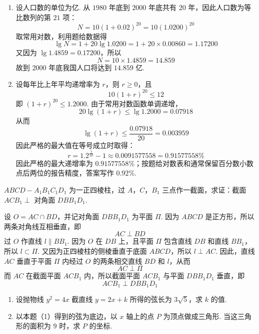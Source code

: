 \documentclass[UTF8,a4paper,oneside,11pt]{ctexbook}
\begin{document}
\begin{solution}
\begin{enumerate}
\item 设人口数的单位为亿. 从 \(1980\) 年底到 \(2000\) 年底共有 \(20\) 年，因此人口数为等比数列的第 \(21\) 项：
\[
N=10(1+0.02)^{20}=10(1.0200)^{20}
\]
取常用对数，利用题给数据得
\[
\lg N=1+20\lg1.0200=1+20\times0.00860=1.17200
\]
又因为 \(\lg1.4859=0.17200\)，所以
\[
N=10\times1.4859=14.859
\]
故到 \(2000\) 年底我国人口将达到 \(14.859\text{ 亿}\).
\item 设每年比上年平均递增率为 \(r\)，则 \(r\ge0\)，且
\[
10(1+r)^{20}\le12
\]
即 \((1+r)^{20}\le1.2000\). 由于常用对数函数单调递增，
\[
20\lg(1+r)\le\lg1.2000=0.07918
\]
从而
\[
\lg(1+r)\le\frac{0.07918}{20}=0.003959
\]
因此严格的最大值在等号成立时取得：
\[
r=1.2^{\frac{1}{20}}-1\approx0.0091577558=0.91577558\%
\]
因此严格的最大递增率为 \(0.91577558\%\)；按题给对数表和通常保留百分数小数点后两位的报告精度，答案写作 \(0.92\%\).
\end{enumerate}
\end{solution}

\begin{problem}
\(ABCD-A_{1}B_{1}C_{1}D_{1}\) 为一正四棱柱，过 \(A\)，\(C\)，\(B_{1}\) 三点作一截面，求证：截面 \(ACB_{1}\perp\) 对角面 \(DBB_{1}D_{1}\).
\end{problem}

\begin{solution}
设 \(O=AC\cap BD\)，并记对角面 \(DBB_{1}D_{1}\) 为平面 \(\Pi\). 因为 \(ABCD\) 是正方形，所以两条对角线互相垂直，即
\[
AC\perp BD
\]
过 \(O\) 作直线 \(l\parallel BB_{1}\). 因为 \(O\) 在 \(DB\) 上，且平面 \(\Pi\) 包含直线 \(DB\) 和直线 \(BB_{1}\)，所以 \(l\subset\Pi\). 又因为正四棱柱的侧棱垂直于底面 \(ABCD\)，所以 \(l\perp AC\). 因此，直线 \(AC\) 垂直于平面 \(\Pi\) 内经过 \(O\) 的两条相交直线 \(BD\) 和 \(l\)，从而
\[
AC\perp\Pi
\]
而 \(AC\) 在截面平面 \(ACB_{1}\) 内，所以截面平面 \(ACB_{1}\) 与平面 \(DBB_{1}D_{1}\) 垂直，即
\[
ACB_{1}\perp DBB_{1}D_{1}
\]
\end{solution}

\begin{problem}
\begin{enumerate}
\item 设抛物线 \(y^{2}=4x\) 截直线 \(y=2x+k\) 所得的弦长为 \(3\sqrt{5}\)，求 \(k\) 的值.
\item 以本题（1）得到的弦为底边，以 \(x\) 轴上的点 \(P\) 为顶点做成三角形. 当这三角形的面积为 \(9\) 时，求 \(P\) 的坐标.
\end{enumerate}
\end{problem}
\end{document}
